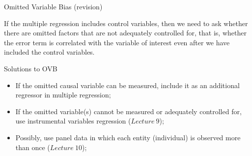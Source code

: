 \documentclass[notes,10pt, aspectratio=169]{beamer}
\begin{document}
\begin{frame}{Omitted Variable Bias (revision)}
\begin{center}
\begin{figure}
{

}
\end{figure}
\end{center}

If the multiple regression includes control variables, then we need to ask whether there are omitted factors that are not adequately controlled for, that is, whether the error term is correlated with the variable of interest even after we have included the control variables.
\end{frame}

\begin{frame}{Solutions to OVB}

\begin{itemize}
    \item If the omitted causal variable can be measured, include it as an additional regressor in multiple regression;\\[1em]
    \item If the omitted variable(s) cannot be measured or adequately controlled for, use instrumental variables regression ($Lecture~9$);\\[1em]
    \item Possibly, use panel data in which each entity (individual) is observed more than once ($Lecture~10$);\\[1em]
\end{itemize}
\end{frame}
\end{document}
